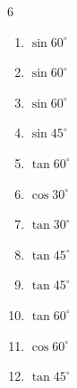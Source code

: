 \begin{multicols}{6}
\begin{enumerate}

  \item $\displaystyle \sin{60^\circ}$


  \item $\displaystyle \sin{60^\circ}$


  \item $\displaystyle \sin{60^\circ}$


  \item $\displaystyle \sin{45^\circ}$


  \item $\displaystyle \tan{60^\circ}$


  \item $\displaystyle \cos{30^\circ}$


  \item $\displaystyle \tan{30^\circ}$


  \item $\displaystyle \tan{45^\circ}$

        \phantom{$\displaystyle =1$}

  \item $\displaystyle \tan{45^\circ}$

        \phantom{$\displaystyle =1$}

\columnbreak %

\resetques

  \item $\displaystyle \tan{60^\circ}$


  \item $\displaystyle \cos{60^\circ}$


  \item $\displaystyle \tan{45^\circ}$


\end{enumerate}
\end{multicols}

